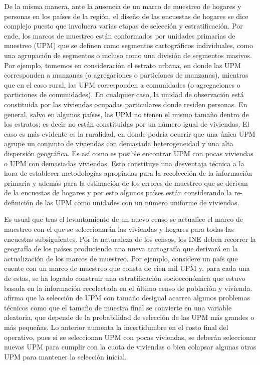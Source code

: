 De la misma manera, ante la ausencia de un marco de muestreo de hogares y personas en los países de la región, el diseño de las encuestas de hogares se dice complejo puesto que involucra varias etapas de selección y estratificación. Por ende, los marcos de muestreo están conformados por unidades primarias de muestreo (UPM) que se definen como segmentos cartográficos individuales, como una agrupación de segmentos o incluso como una división de segmentos masivos. Por ejemplo, tomemos en consideración el estrato urbana, en donde las UPM corresponden a manzanas (o agregaciones o particiones de manzanas), mientras que en el caso rural, las UPM corresponden a comunidades (o agregaciones o particiones de comunidades). En cualquier caso, la unidad de observación está constituida por las viviendas ocupadas particulares donde residen personas. En general, salvo en algunos países, las UPM no tienen el mismo tamaño dentro de los estratos; es decir no están constituidas por un número igual de viviendas. El caso es más evidente es la ruralidad, en donde podría ocurrir que una única UPM agrupe un conjunto de viviendas con demasiada heterogeneidad y una alta dispersión geográfica. Es así como es posible encontrar UPM con pocas viviendas o UPM con demasiadas viviendas. Esto constituye una desventaja técnica a la hora de establecer metodologías apropiadas para la recolección de la información primaria y además para la estimación de los errores de muestreo que se derivan de la encuestas de hogares y por esto algunos países están considerando la re-definición de las UPM como unidades con un número uniforme de viviendas.

Es usual que tras el levantamiento de un nuevo censo se actualice el marco de muestreo con el que se seleccionarán las viviendas y hogares para todas las encuestas subsiguientes. Por la naturaleza de los censos, los INE deben recorrer la geografía de los países produciendo una nueva cartografía que derivará en la actualización de los marcos de muestreo. Por ejemplo, considere un país que cuente con un marco de muestreo que consta de cien mil UPM y, para cada una de estas, se ha logrado construir una estratificación socioeconómica que estuvo basada en la información recolectada en el último censo de población y vivienda. \citet[pág. 183]{Kish_1965} afirma que la selección de UPM con tamaño desigual acarrea algunos problemas técnicos como que el tamaño de muestra final se convierte en una variable aleatoria, que depende de la probabilidad de selección de las UPM más grandes o más pequeñas. Lo anterior aumenta la incertidumbre en el costo final del operativo, pues si se seleccionan UPM con pocas viviendas, se deberán seleccionar nuevas UPM para cumplir con la cuota de viviendas o bien colapsar algunas otras UPM para mantener la selección inicial.

